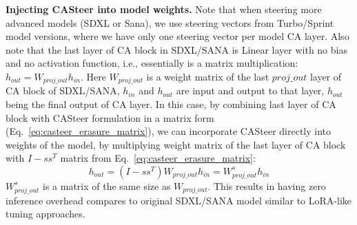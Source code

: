 \noindent\textbf{Injecting CASteer into model weights.}
Note that when steering more advanced models (SDXL or Sana), we use steering vectors from Turbo/Sprint model versions, where we have only one steering vector per model CA layer. 
Also note that the last layer of CA block in SDXL/SANA is Linear layer with no bias and no activation function, i.e., essentially is a matrix multiplication:
$h_{out} = W_{proj\_out}h_{in}.$
Here $W_{proj\_out}$ is a weight matrix of the last $proj\_out$ layer of CA block of SDXL/SANA, $h_{in}$ and $h_{out}$ are input and output to that layer, $h_{out}$ being the final output of CA layer.
In this case, by combining last layer of CA block with CASteer formulation in a matrix form (Eq.~\ref{eq:casteer_erasure_matrix}), we can incorporate CASteer directly into weights of the model, by multiplying weight matrix of the last layer of CA block with $I - ss^T$ matrix from Eq.~\ref{eq:casteer_erasure_matrix}:
\begin{equation}
    h_{out} = (I - ss^T)W_{proj\_out}h_{in}  = W^{s}_{proj\_out}h_{in}
\end{equation}
$W^{s}_{proj\_out}$ is a matrix of the same size as $W_{proj\_out}$. This results in having zero inference overhead compares to original SDXL/SANA model similar to LoRA-like tuning approaches. 






